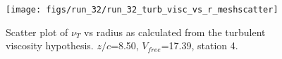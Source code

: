 \begin{figure}[H]
\centering
\texttt{[image: figs/run\_32/run\_32\_turb\_visc\_vs\_r\_meshscatter]}
\caption{Scatter plot of $\nu_T$ vs radius as calculated from the turbulent viscosity hypothesis. $z/c$=8.50, $V_{free}$=17.39, station 4.}
\label{fig:run_32_turb_visc_vs_r_meshscatter}
\end{figure}


